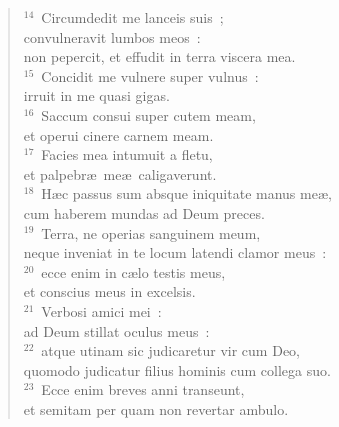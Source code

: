\begin{flushleft}
\begin{verse}
${}^{14}$~Circumdedit me lanceis suis~;\\ convulneravit lumbos meos~:\\ non pepercit, et effudit in terra viscera mea.\\
${}^{15}$~Concidit me vulnere super vulnus~:\\ irruit in me quasi gigas.\\
${}^{16}$~Saccum consui super cutem meam,\\ et operui cinere carnem meam.\\
${}^{17}$~Facies mea intumuit a fletu,\\ et palpebr\ae\ me\ae\ caligaverunt.\\
${}^{18}$~H\ae c passus sum absque iniquitate manus me\ae ,\\ cum haberem mundas ad Deum preces.\\
${}^{19}$~Terra, ne operias sanguinem meum,\\ neque inveniat in te locum latendi clamor meus~:\\
${}^{20}$~ecce enim in c\ae lo testis meus,\\ et conscius meus in excelsis.\\
${}^{21}$~Verbosi amici mei~:\\ ad Deum stillat oculus meus~:\\
${}^{22}$~atque utinam sic judicaretur vir cum Deo,\\ quomodo judicatur filius hominis cum collega suo.\\
${}^{23}$~Ecce enim breves anni transeunt,\\ et semitam per quam non revertar ambulo.\end{verse}\end{flushleft}


